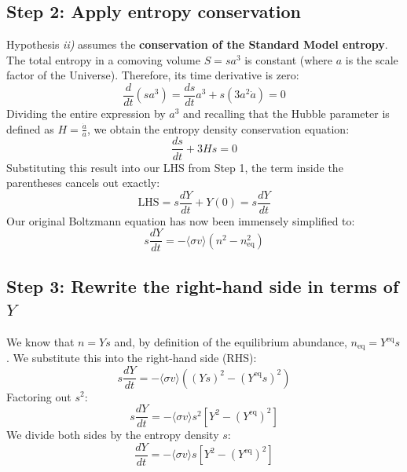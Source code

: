 \documentclass[11pt,a4paper]{article}
\begin{document}
\subsection*{Step 2: Apply entropy conservation}
Hypothesis \textit{ii)} assumes the \textbf{conservation of the Standard Model entropy}. The total entropy in a comoving volume $S = s a^3$ is constant (where $a$ is the scale factor of the Universe). Therefore, its time derivative is zero:
\begin{equation}
    \frac{d}{dt}(s a^3) = \frac{ds}{dt}a^3 + s(3a^2 \dot{a}) = 0
\end{equation}
Dividing the entire expression by $a^3$ and recalling that the Hubble parameter is defined as $H = \frac{\dot{a}}{a}$, we obtain the entropy density conservation equation:
\begin{equation}
    \frac{ds}{dt} + 3Hs = 0
\end{equation}
Substituting this result into our LHS from Step 1, the term inside the parentheses cancels out exactly:
\begin{equation}
    \text{LHS} = s \frac{dY}{dt} + Y (0) = s \frac{dY}{dt}
\end{equation}
Our original Boltzmann equation has now been immensely simplified to:
\begin{equation}
    s \frac{dY}{dt} = -\langle\sigma v\rangle \left(n^2 - n_{\text{eq}}^2\right)
\end{equation}

\subsection*{Step 3: Rewrite the right-hand side in terms of $Y$}
We know that $n = Ys$ and, by definition of the equilibrium abundance, $n_{\text{eq}} = Y^{\text{eq}}s$. We substitute this into the right-hand side (RHS):
\begin{equation}
    s \frac{dY}{dt} = -\langle\sigma v\rangle \left( (Ys)^2 - (Y^{\text{eq}}s)^2 \right)
\end{equation}
Factoring out $s^2$:
\begin{equation}
    s \frac{dY}{dt} = -\langle\sigma v\rangle s^2 \left[ Y^2 - (Y^{\text{eq}})^2 \right]
\end{equation}
We divide both sides by the entropy density $s$:
\begin{equation}
\label{eq:partialyield}
    \frac{dY}{dt} = -\langle\sigma v\rangle s \left[ Y^2 - (Y^{\text{eq}})^2 \right]
\end{equation}
\end{document}
